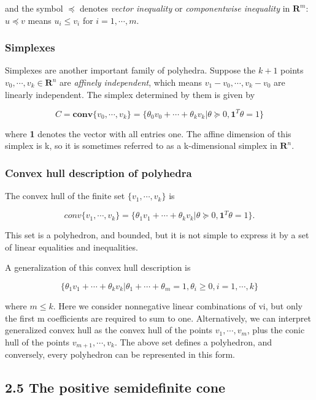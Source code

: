 \documentclass{article}
\begin{document}
and the symbol $\preceq$ denotes \textit{vector inequality} or \textit{componentwise inequality} in $\mathbf{R}^m$:
$u \preceq v$ means $u_i \le v_i$ for $i=1,\cdots,m$.

\subsubsection*{Simplexes}

Simplexes are another important family of polyhedra. Suppose the $k+1$ points
$v_0,\cdots,v_k \in \mathbf{R}^n$ are \textit{affinely independent}, which means $v_1-v_0,\cdots,v_k-v_0$ are
linearly independent. The simplex determined by them is given by

\[
C=\mathbf{conv}\{v_0,\cdots,v_k\}=\{\theta_0v_0+\cdots+\theta_kv_k|\theta\succeq 0,\mathbf{1}^T\theta=1\}
\]

where \textbf{1} denotes the vector with all entries one. The affine dimension of this simplex
is k, so it is sometimes referred to as a k-dimensional simplex in $\mathbf{R}^n$.

\subsubsection*{Convex hull description of polyhedra}

The convex hull of the finite set $\{v_1,\cdots,v_k\}$ is

\[
conv\{v_1,\cdots,v_k\}=\{\theta_1v_1+\cdots+\theta_kv_k|\theta\succeq 0,\mathbf{1}^T\theta=1\}.
\]

This set is a polyhedron, and bounded, but it is not simple to express it by a set of linear equalities and inequalities.

A generalization of this convex hull description is

\[
\{\theta_1v_1+\cdots+\theta_kv_k|\theta_1+\cdots+\theta_m=1,\theta_i\ge0,i=1,\cdots,k\}    
\]

where $m\le k$. Here we consider nonnegative linear combinations of vi, but only
the first m coefficients are required to sum to one. Alternatively, we can interpret generalized convex hull as the convex hull of the points $v_1,\cdots,v_m$, plus the conic hull of the
points $v_{m+1},\cdots,v_k$. The above set defines a polyhedron, and conversely, every
polyhedron can be represented in this form.

\subsection*{2.5 The positive semidefinite cone}
\end{document}
